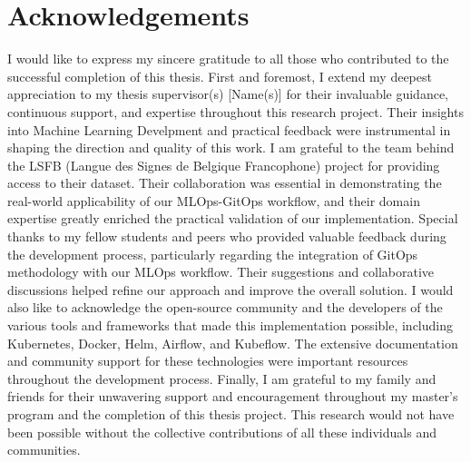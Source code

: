 \section*{Acknowledgements}
I would like to express my sincere gratitude to all those who contributed to the successful completion of this thesis.
First and foremost, I extend my deepest appreciation to my thesis supervisor(s) [Name(s)] for their invaluable guidance, continuous support, and expertise throughout this research project.
Their insights into Machine Learning Develpment and practical feedback were instrumental in shaping the direction and quality of this work.
I am grateful to the team behind the LSFB (Langue des Signes de Belgique Francophone) project for providing access to their dataset.
Their collaboration was essential in demonstrating the real-world applicability of our MLOps-GitOps workflow, and their domain expertise greatly enriched the practical validation of our implementation.
Special thanks to my fellow students and peers who provided valuable feedback during the development process, particularly regarding the integration of GitOps methodology with our MLOps workflow.
Their suggestions and collaborative discussions helped refine our approach and improve the overall solution.
I would also like to acknowledge the open-source community and the developers of the various tools and frameworks that made this implementation possible, including Kubernetes, Docker, Helm, Airflow, and Kubeflow.
The extensive documentation and community support for these technologies were important resources throughout the development process.
Finally, I am grateful to my family and friends for their unwavering support and encouragement throughout my master's program and the completion of this thesis project.
This research would not have been possible without the collective contributions of all these individuals and communities.